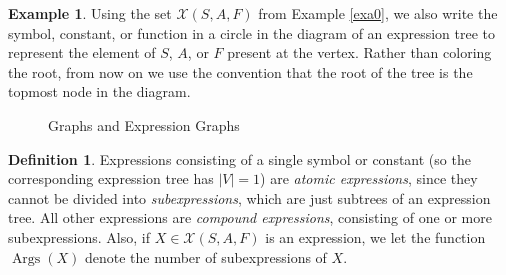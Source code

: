 \documentclass{article}
\theoremstyle{definition}
\newtheorem{defin}[thm]{Definition}
\newtheorem{exa}[thm]{Example}
\DeclareMathOperator{\args}{Args}
\begin{document}
\begin{exa}
    Using the set $\mathcal{X}(S, A, F)$ from Example \ref{exa0}, we also write the symbol, constant, or function in a circle in the diagram of an expression tree to represent the element of $S$, $A$, or $F$ present at the vertex. Rather than coloring the root, from now on we use the convention that the root of the tree is the topmost node in the diagram.
    \begin{figure}[H]
  \centering
     \hspace{2cm}
    \caption{Graphs and Expression Graphs}
\end{figure}
\end{exa}

\begin{defin}
    Expressions consisting of a single symbol or constant (so the corresponding expression tree has $|V| = 1$) are \emph{atomic expressions}, since they cannot be divided into \emph{subexpressions}, which are just subtrees of an expression tree. All other expressions are \emph{compound expressions}, consisting of one or more subexpressions. Also, if $X \in \mathcal{X}(S,A,F)$ is an expression, we let the function $\args(X)$ denote the number of subexpressions of $X$.
\end{defin}
\end{document}
